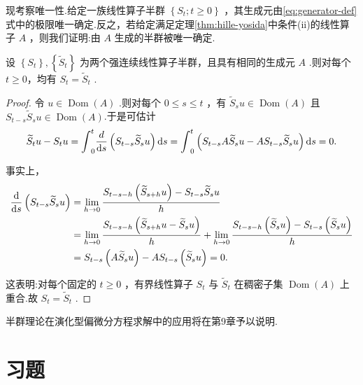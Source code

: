 现考察唯一性.给定一族线性算子半群 $\left\{  {{S}_{t};t \geq  0}\right\}$ ，其生成元由\eqref{eq:generator-def}式中的极限唯一确定.反之，若给定满足定理\ref{thm:hille-yosida}中条件(ii)的线性算子 $A$ ，则我们证明:由 $A$ 生成的半群被唯一确定.

\begin{theorem}[半群的唯一性]\label{thm:semigroup-uniqueness}
设 $\left\{  {S}_{t}\right\}  ,\left\{  {\widetilde{S}}_{t}\right\}$ 为两个强连续线性算子半群，且具有相同的生成元 $A$ .则对每个 $t \geq  0$，均有 ${S}_{t} = {\widetilde{S}}_{t}$ .
\end{theorem}

\begin{proof}
令 $u \in  \operatorname{Dom}\left( A\right)$ .则对每个 $0 \leq  s \leq  t$ ，有 ${\widetilde{S}}_{s}u \in  \operatorname{Dom}\left( A\right)$ 且 ${S}_{t - s}{\widetilde{S}}_{s}u \in  \operatorname{Dom}\left( A\right)$.于是可估计
\[
{\widetilde{S}}_{t}u - {S}_{t}u = {\int }_{0}^{t}\frac{d}{\mathop{}\!\mathrm{d} s}\left(  {{S}_{t - s}{\widetilde{S}}_{s}u}\right)  {\mathop{}\!\mathrm{d} s} = {\int }_{0}^{t}\left(  {{S}_{t - s}A{\widetilde{S}}_{s}u - A{S}_{t - s}{\widetilde{S}}_{s}u}\right)  {\mathop{}\!\mathrm{d} s} = 0.
\]

事实上，
{\setjot[-1]\begin{align*}
    \frac{\mathop{}\!\mathrm{d}}{\mathop{}\!\mathrm{d} s}\left(  {{S}_{t - s}{\widetilde{S}}_{s}u}\right)   &= \mathop{\lim }\limits_{{h \rightarrow  0}}\frac{{S}_{t - s - h}\left( {{\widetilde{S}}_{s + h}u}\right)  - {S}_{t - s}{\widetilde{S}}_{s}u}{h}\\
    &= \mathop{\lim }\limits_{{h \rightarrow  0}}\frac{{S}_{t - s - h}\left( {{\widetilde{S}}_{s + h}u - {\widetilde{S}}_{s}u}\right) }{h} + \mathop{\lim }\limits_{{h \rightarrow  0}}\frac{{S}_{t - s - h}\left( {{\widetilde{S}}_{s}u}\right)  - {S}_{t - s}\left( {{\widetilde{S}}_{s}u}\right) }{h}\\
    &= {S}_{t - s}\left( {A{\widetilde{S}}_{s}u}\right)  - A{S}_{t - s}\left( {{\widetilde{S}}_{s}u}\right)  = 0.
\end{align*}}


这表明:对每个固定的 $t \geq  0$ ，有界线性算子 ${S}_{t}$ 与 ${\widetilde{S}}_{t}$ 在稠密子集 $\operatorname{Dom}\left( A\right)$ 上重合.故 ${S}_{t} = {\widetilde{S}}_{t}$ .
\end{proof}

半群理论在演化型偏微分方程求解中的应用将在第9章予以说明.

\section{习题}

